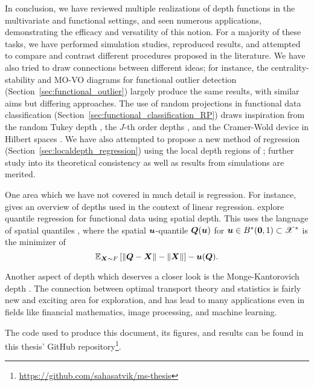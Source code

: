 

In conclusion, we have reviewed multiple realizations of depth functions in
the multivariate and functional settings, and seen numerous applications,
demonstrating the efficacy and versatility of this notion.
For a majority of these tasks, we have performed simulation studies,
reproduced results, and attempted to compare and contrast different procedures
proposed in the literature.
We have also tried to draw connections between different ideas; for instance,
the centrality-stability and MO-VO diagrams for functional outlier detection
(Section~\ref{sec:functional_outlier}) largely produce the same results, with
similar aims but differing approaches.
The use of random projections in functional data classification
(Section~\ref{sec:functional_classification_RP}) draws inspiration from the
random Tukey depth \parencite{albertos-reyes-2008a}, the $J$-th order depths
\parencite{nagy-gijbels-hlubinka-2017}, and the Cramer-Wold device in Hilbert
spaces \parencite{albertos-fraiman-ransford-2007}.
We have also attempted to propose a new method of regression
(Section~\ref{sec:localdepth_regression}) using the local depth regions of
\textcite{paindaveine-bever-2013}; further study into its theoretical
consistency as well as results from simulations are merited.

One area which we have not covered in much detail is regression.
For instance, \textcite{zuo-2021} gives an overview of depths used in the
context of linear regression.
\textcite{chowdhury-chaudhuri-2019} explore quantile regression for functional
data using spatial depth.
This uses the language of spatial quantiles
\parencite{chakraborty-chaudhuri-2014b}, where the spatial $\bm{u}$-quantile
$\bm{Q}(\bm{u})$ for $\bm{u} \in B^*(\bm{0}, 1) \subset \mathscr{X}^*$ is the
minimizer of
\begin{equation}
    \operatorname{\mathbb{E}}_{\bm{X} \sim F}\left[\Vert \bm{Q} - \bm{X} \Vert - \Vert \bm{X} \Vert\right] - \bm{u}(\bm{Q}).
\end{equation}

Another aspect of depth which deserves a closer look is the Monge-Kantorovich
depth \parencite{chernozhukov-galichon-hallin-henry-2017}.
The connection between optimal transport theory and statistics is fairly new
and exciting area for exploration, and has lead to many applications even in
fields like financial mathematics, image processing, and machine learning.

The code used to produce this document, its figures, and results can be found
in this thesis' GitHub
repository\footnote{\url{https://github.com/sahasatvik/ms-thesis}}.
